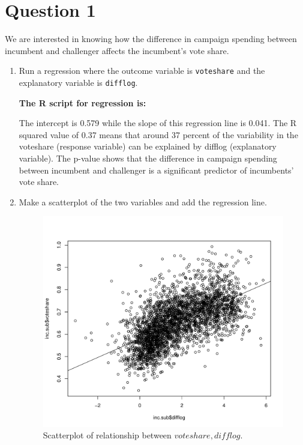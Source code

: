 \documentclass[12pt,letterpaper]{article}
\begin{document}
\section*{Question 1}
\vspace{.25cm}
\noindent We are interested in knowing how the difference in campaign spending between incumbent and challenger affects the incumbent's vote share. 
	\begin{enumerate}
		\item Run a regression where the outcome variable is \texttt{voteshare} and the explanatory variable is \texttt{difflog}.
		
\textbf{		The R script for regression is:}
		  
		
		The intercept is 0.579 while the slope of this regression line is 0.041. The R squared value of 0.37 means that around 37 percent of the variability in the voteshare (response variable) can be explained by difflog (explanatory variable). The p-value shows that the difference in campaign spending between incumbent and challenger is a significant predictor of incumbents' vote share.
		
		
		\item Make a scatterplot of the two variables and add the regression line. 
		
		  
		
		
		\begin{figure}[h!]\centering	\caption{\footnotesize Scatterplot of relationship between $voteshare, difflog$.}	
		
		\includegraphics[width=.85\textwidth]{plot1.pdf}
		

\end{figure}
\end{enumerate}
\end{document}
